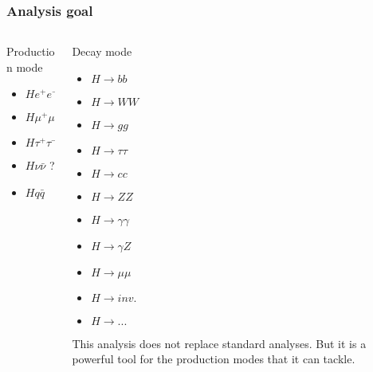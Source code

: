 \providecommand{\thiscolor}{\color{green}}
\providecommand{\thischeck}{{\thiscolor\cmark}}
\providecommand{\standardcolor}{\color{orange}}
\providecommand{\standardcheck}{{\standardcolor\cmark}}

\begin{frame}
    \frametitle{Analysis goal}
    \begin{columns}[onlytextwidth]
    \begin{column}{0.4\textwidth}
        \ColoredHiggsstrahlung
        \begin{block}{\color{LLR_red}Production mode}\color{black}
        \begin{itemize}
            \item $H e^+ e^-$ \standardcheck \thischeck
            \item $H \mu^+ \mu^-$ \standardcheck \thischeck
            \item $H \tau^+ \tau^-$ \standardcheck
            \item $H \nu \bar{\nu}$ \standardcheck {\thiscolor ?}
            \item $H q \bar{q}$ \standardcheck
        \end{itemize}
        \end{block}
        \end{column}
        \begin{column}{0.6\textwidth}
        \begin{block}{\color{ILD_blue}Decay mode}\color{black}
            \begin{multicols}{2}
            \begin{itemize}
            \item $H \to bb$ \thischeck
            \item $H \to WW$ \thischeck
            \item $H \to gg$ \thischeck
            \item $H \to \tau \tau$ \thischeck
            \item $H \to cc$ \thischeck
            \item $H \to ZZ$ \thischeck
            \item $H \to \gamma \gamma$ \thischeck
            \item $H \to \gamma Z$ \thischeck
            \item $H \to \mu \mu$ \standardcheck \thischeck
            \item $H \to inv.$ \thischeck
            \item $H \to ...$ \thischeck
        \end{itemize}
        \end{multicols}
        \end{block}
        \newline\newline
        {\thiscolor This} analysis does not replace {\standardcolor standard} analyses.
        But it is a powerful tool for the production modes that it can tackle.
    \end{column}
    \end{columns}
    \end{frame}
